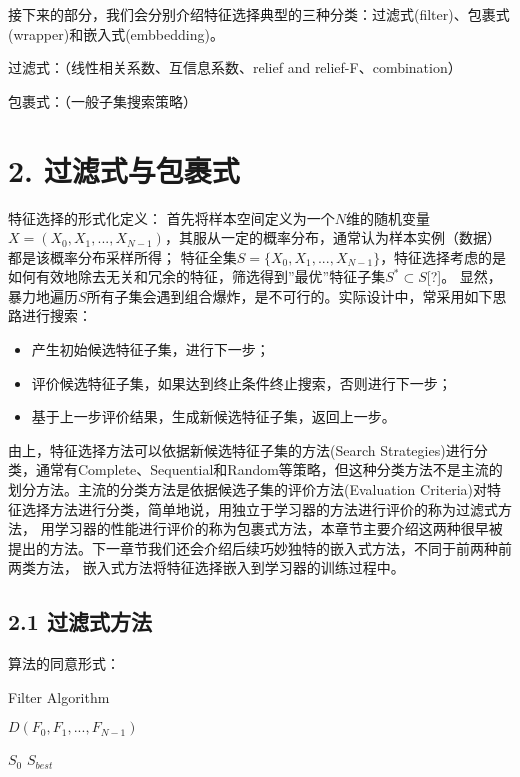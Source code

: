 \documentclass[a4paper,UTF8]{article}
\begin{document}
  接下来的部分，我们会分别介绍特征选择典型的三种分类：过滤式(filter)、包裹式(wrapper)和嵌入式(embbedding)。

  过滤式：（线性相关系数、互信息系数、relief and relief-F、combination）

  包裹式：（一般子集搜索策略）





\section*{2. 过滤式与包裹式}
  特征选择的形式化定义：
  首先将样本空间定义为一个$ N $维的随机变量$ X = (X_{0}, X_{1}, ... , X_{N-1})$，其服从一定的概率分布，通常认为样本实例（数据）都是该概率分布采样所得；
  特征全集$ S = \{X_{0}, X_{1}, ... , X_{N-1}\} $，特征选择考虑的是如何有效地除去无关和冗余的特征，筛选得到”最优”特征子集$ S^{*} \subset S $[?]。
  显然，暴力地遍历$ S $所有子集会遇到组合爆炸，是不可行的。实际设计中，常采用如下思路进行搜索：

  \begin{itemize}

    \item 产生初始候选特征子集，进行下一步；
    \item 评价候选特征子集，如果达到终止条件终止搜索，否则进行下一步；
    \item 基于上一步评价结果，生成新候选特征子集，返回上一步。

  \end{itemize}
  由上，特征选择方法可以依据新候选特征子集的方法(Search Strategies)进行分类，通常有Complete、Sequential和Random等策略，但这种分类方法不是主流的
  划分方法。主流的分类方法是依据候选子集的评价方法(Evaluation Criteria)对特征选择方法进行分类，简单地说，用独立于学习器的方法进行评价的称为过滤式方法，
  用学习器的性能进行评价的称为包裹式方法，本章节主要介绍这两种很早被提出的方法。下一章节我们还会介绍后续巧妙独特的嵌入式方法，不同于前两种前两类方法，
  嵌入式方法将特征选择嵌入到学习器的训练过程中。


\subsection*{2.1 过滤式方法}
  算法的同意形式：

  \begin{algorithm}
    \caption{Filter Algorithm}
    \begin{algorithmic}
      \REQUIRE $ D(F_{0}, F_{1},..., F_{N-1})$

               $ S_{0}$
      \ENSURE $ S_{best} $

    \end{algorithmic}




  \end{algorithm}
\end{document}
